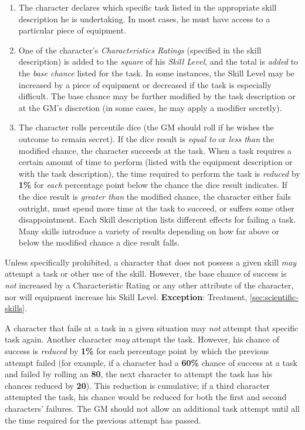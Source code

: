 \renewcommand{\theenumi}{\arabic{enumi}}
\begin{enumerate}
\item The character declares which specific task listed in the
  appropriate skill description he is undertaking.  In most cases, he
  must have access to a particular piece of equipment.
\item One of the character's \emph{Characteristics Ratings} (specified
  in the skill description) is added to the \emph{square} of his
  \emph{Skill Level}, and the total is \emph{added} to the \emph{base
    chance} listed for the task.  In some instances, the Skill Level
  may be increased by a piece of equipment or decreased if the task is
  especially difficult.  The base chance may be further modified by the
  task description or at the GM's discretion (in some cases, he may
  apply a modifier secretly).
\item The character rolls percentile dice (the GM should roll if he
  wishes the outcome to remain secret).  If the dice result is
  \emph{equal to} or \emph{less than} the modified chance, the
  character succeeds at the task.  When a task requires a certain
  amount of time to perform (listed with the equipment description or
  with the task description), the time required to perform the task is
  \emph{reduced} by \textbf{1\%} for \emph{each} percentage point
  below the chance the dice result indicates.  If the dice result is
  \emph{greater than} the modified chance, the character either fails
  outright, must spend more time at the task to succeed, or suffers
  some other disappointment.  Each Skill description lists different
  effects for failing a task.  Many skills introduce a variety of
  results depending on how far above or below the modified chance a
  dice result falls.
\end{enumerate}

Unless specifically prohibited, a character that does not possess a
given skill \emph{may} attempt a task or other use of the skill.
However, the base chance of success is \emph{not} increased by a
Characteristic Rating or any other attribute of the character, nor
will equipment increase his Skill Level. \textbf{Exception}:
Treatment, \ref{sec:scientific-skills}.

A character that fails at a task in a given situation may \emph{not}
attempt that specific task again.  Another character \emph{may} attempt
the task.  However, his chance of success is \emph{reduced} by
\textbf{1\%} for each percentage point by which the previous attempt
failed (for example, if a character had a \textbf{60\%} chance of
success at a task and failed by rolling an \textbf{80}, the next
character to attempt the task has his chances reduced by \textbf{20}).
This reduction is cumulative; if a third character attempted the task,
his chance would be reduced for both the first and second characters'
failures.  The GM should not allow an additional task attempt until all
the time required for the previous attempt has passed.


